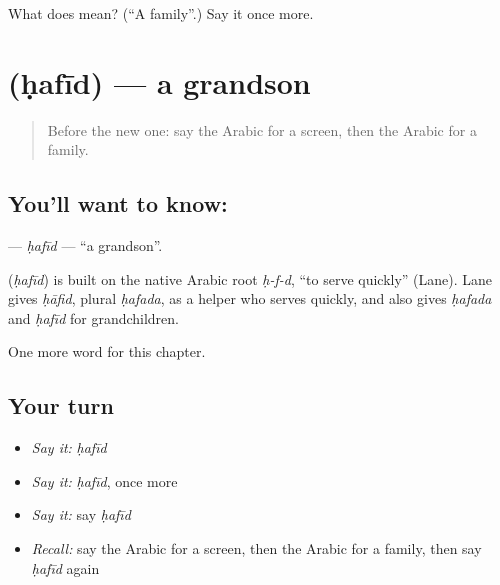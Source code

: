 \begin{tcolorbox}[breakable,colback=teal!4,colframe=teal!35!black,title={Before you move on}]
What does  mean? (\textquotedblleft{}A family\textquotedblright{}.) Say it once more.
\end{tcolorbox}
\section[\texorpdfstring{\ar{حفيد} (ḥafīd)}{حفيد (ḥafīd)}]{ (ḥafīd) — a grandson}

\label{lesson:AR-C246-hafid}



\begin{quote}
Before the new one: say the Arabic for a screen, then the Arabic for a family.
\end{quote}

\subsection*{You'll want to know: }
\textbf{} — \emph{ḥafīd} — \textquotedblleft{}a grandson\textquotedblright{}.

\begin{cousinweb}
\textbf{} (\emph{ḥafīd}) is built on the native Arabic root \emph{ḥ-f-d}, \textquotedblleft{}to serve quickly\textquotedblright{} (Lane). Lane gives \emph{ḥāfid}, plural \emph{ḥafada}, as a helper who serves quickly, and also gives \emph{ḥafada} and \emph{ḥafīd} for grandchildren.
\end{cousinweb}

\begin{grammarlens}[title={What you've built}]
One more word for this chapter.
\end{grammarlens}

\subsection*{Your turn}
\begin{itemize}
\raggedright
  \item \emph{Say it:} \emph{ḥafīd}
  \item \emph{Say it:} \emph{ḥafīd}, once more
  \item \emph{Say it:} say \emph{ḥafīd}
  \item \emph{Recall:} say the Arabic for a screen, then the Arabic for a family, then say \emph{ḥafīd} again
\end{itemize}

